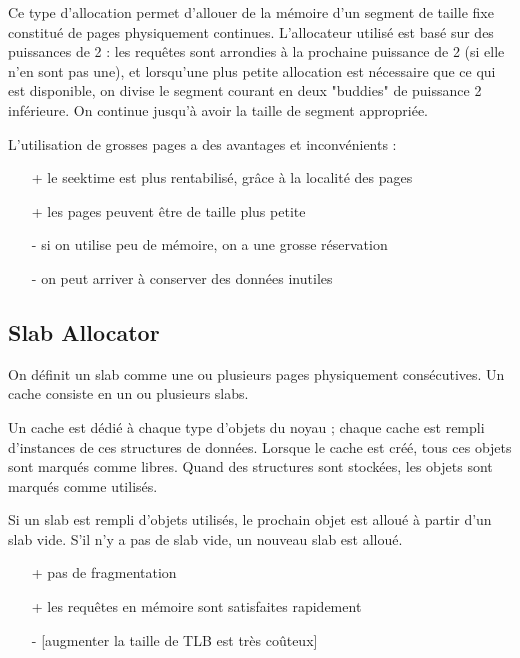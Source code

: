 Ce type d'allocation permet d'allouer de la mémoire d'un segment de taille fixe constitué de pages physiquement continues. L'allocateur utilisé est basé sur des puissances de 2 : les requêtes sont arrondies à la prochaine puissance de 2 (si elle n'en sont pas une), et lorsqu'une plus petite allocation est nécessaire que ce qui est disponible, on divise le segment courant en deux "buddies" de puissance 2 inférieure. On continue jusqu'à avoir la taille de segment appropriée.


L'utilisation de grosses pages a des avantages et inconvénients :
\begin{itemize}
	\item[+] le seektime est plus rentabilisé, grâce à la localité des pages
	\item[+] les pages peuvent être de taille plus petite
	\item[-] si on utilise peu de mémoire, on a une grosse réservation
	\item[-] on peut arriver à conserver des données inutiles
\end{itemize}

\subsection{Slab Allocator}

On définit un slab comme une ou plusieurs pages physiquement consécutives. Un cache consiste en un ou plusieurs slabs.


Un cache est dédié à chaque type d'objets du noyau ; chaque cache est rempli d'instances de ces structures de données. Lorsque le cache est créé, tous ces objets sont marqués comme libres. Quand des structures sont stockées, les objets sont marqués comme utilisés.

Si un slab est rempli d'objets utilisés, le prochain objet est alloué à partir d'un slab vide. S'il n'y a pas de slab vide, un nouveau slab est alloué.

\begin{itemize}
	\item[+] pas de fragmentation
	\item[+] les requêtes en mémoire sont satisfaites rapidement
	\item[-] [augmenter la taille de TLB est très coûteux] 
\end{itemize}

